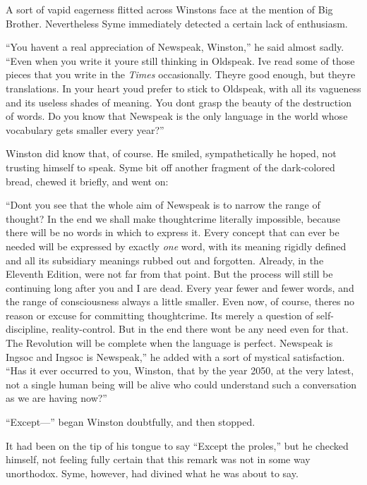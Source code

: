 A sort of vapid eagerness flitted across Winston\textquotesingle s face
at the mention of Big Brother. Nevertheless Syme immediately detected a
certain lack of enthusiasm.

``You haven\textquotesingle t a real appreciation of Newspeak, Winston,''
he said almost sadly. ``Even when you write it you\textquotesingle re
still thinking in Oldspeak. I\textquotesingle ve read some of those
pieces that you write in the \emph{Times} occasionally.
They\textquotesingle re good enough, but they\textquotesingle re
translations. In your heart you\textquotesingle d prefer to stick to
Oldspeak, with all its vagueness and its useless shades of meaning. You
don\textquotesingle t grasp the beauty of the destruction of words. Do
you know that Newspeak is the only language in the world whose
vocabulary gets smaller every year?''

Winston did know that, of course. He smiled, sympathetically he hoped,
not trusting himself to speak. Syme bit off another fragment of the
dark-colored bread, chewed it briefly, and went on:

``Don\textquotesingle t you see that the whole aim of Newspeak is to
narrow the range of thought? In the end we shall make thoughtcrime
literally impossible, because there will be no words in which to express
it. Every concept that can ever be needed will be expressed by exactly
\emph{one} word, with its meaning rigidly defined and all its subsidiary
meanings rubbed out and forgotten. Already, in the Eleventh Edition,
we\textquotesingle re not far from that point. But the process will
still be continuing long after you and I are dead. Every year fewer and
fewer words, and the range of consciousness always a little smaller.
Even now, of course, there\textquotesingle s no reason or excuse for
committing thoughtcrime. It\textquotesingle s merely a question of
self-discipline, reality-control. But in the end there
won\textquotesingle t be any need even for that. The Revolution will be
complete when the language is perfect. Newspeak is Ingsoc and Ingsoc is
Newspeak,'' he added with a sort of mystical satisfaction. ``Has it ever
occurred to you, Winston, that by the year 2050, at the very latest, not
a single human being will be alive who could understand such a
conversation as we are having now?''

``Except---'' began Winston doubtfully, and then stopped.

It had been on the tip of his tongue to say ``Except the proles,'' but he
checked himself, not feeling fully certain that this remark was not in
some way unorthodox. Syme, however, had divined what he was about to
say.

